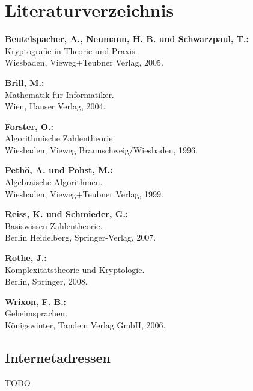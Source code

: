 \section{Literaturverzeichnis}

\textbf{Beutelspacher, A., Neumann, H. B. und Schwarzpaul, T.:}\\
Kryptografie in Theorie und Praxis.\\
Wiesbaden, Vieweg+Teubner Verlag, 2005.

\textbf{Brill, M.:}\\
Mathematik für Informatiker.\\
Wien, Hanser Verlag, 2004.

\textbf{Forster, O.:}\\
Algorithmische Zahlentheorie.\\
Wiesbaden, Vieweg Braunschweig/Wiesbaden, 1996.

\textbf{Pethö, A. und Pohst, M.:}\\
Algebraische Algorithmen.\\
Wiesbaden, Vieweg+Teubner Verlag, 1999.

\textbf{Reiss, K. und Schmieder, G.:}\\
Basiswissen Zahlentheorie.\\
Berlin Heidelberg, Springer-Verlag, 2007.

\textbf{Rothe, J.:}\\
Komplexitätstheorie und Kryptologie.\\
Berlin, Springer, 2008.

\textbf{Wrixon, F. B.:}\\
Geheimsprachen.\\
Königswinter, Tandem Verlag GmbH, 2006.

\newpage
\subsection*{Internetadressen}

TODO
